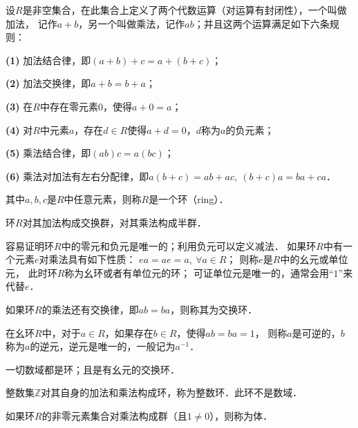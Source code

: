 \begin{definition}\label{chtop:def_ring}
    设$R$是非空集合，在此集合上定义了两个代数运算（对运算有封闭性），一个叫做{\kaishu 加法}，
    记作$a+b$，另一个叫做{\kaishu 乘法}，记作$ab$；并且这两个运算满足如下六条规则：
    
    {\bfseries (1)} 加法结合律，即$(a+b)+c=a+(b+c)$；
    
    {\bfseries (2)} 加法交换律，即$a+b=b+a$；
    
    {\bfseries (3)} 在$R$中存在零元素$0$，使得$a+0=a$；
    
    {\bfseries (4)} 对$R$中元素$a$，存在$d\in R$使得$a+d=0$，$d$称为$a$的负元素；
    
    {\bfseries (5)} 乘法结合律，即$(ab)c=a(bc)$；
    
    {\bfseries (6)} 乘法对加法有左右分配律，即$a(b+c)=ab+ac,\ (b+c)a= ba + ca$．
    
    其中$a,b,c$是$R$中任意元素，则称$R$是一个{\heiti 环}（ring）．
\end{definition}

环$R$对其加法构成交换群，对其乘法构成半群．

容易证明环$R$中的零元和负元是唯一的；利用负元可以定义减法．
如果环$R$中有一个元素$e$对乘法具有如下性质：
$e a = a e  =a, \ \forall a \in R $；
则称$e$是$R$中的{\heiti 幺元}或单位元，
此时环$R$称为{\heiti 幺环}或者有单位元的环；
可证单位元是唯一的，通常会用“$1$”来代替$e$．

如果环$R$的乘法还有交换律，即$ab=ba$，则称其为{\heiti 交换环}．

在幺环$R$中，对于$a\in R$，如果存在$b\in R$，使得$ab=ba =1$，
则称$a$是可逆的，$b$称为$a$的逆元，逆元是唯一的，一般记为$a^{-1}$．



\begin{example}
    一切数域都是环；且是有幺元的交换环．
\end{example}

\begin{example}
    整数集$\mathbb{Z}$对其自身的加法和乘法构成环，称为{\heiti 整数环}．此环不是数域．
\end{example}

\begin{definition}
如果环$R$的非零元素集合对乘法构成群（且$1\neq 0$），则称为{\heiti 体}．
\end{definition}

